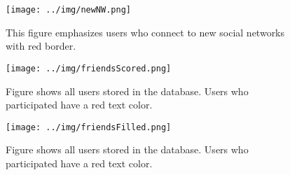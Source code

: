 \documentclass[preprint,12pt]{elsarticle}
\begin{document}
\begin{figure}
  \texttt{[image: ../img/newNW.png]}
 \caption{This figure emphasizes users who connect to new social networks with
   red border.}
\label{fig:newNW}
\end{figure}




\begin{figure}
  \texttt{[image: ../img/friendsScored.png]}
\caption{Figure shows all users stored in the database. Users who
  participated have a red text color.}
\label{fig:friendsScored}
\end{figure}

\begin{figure}
  \texttt{[image: ../img/friendsFilled.png]}
\caption{Figure shows all users stored in the database. Users who
  participated have a red text color.}
\label{fig:friendsFilled}
\end{figure}
\end{document}
